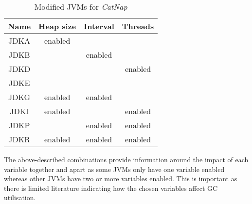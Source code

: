 \begin{table}
    \centering
    \begin{tabular}{|c|c|c|c|}
    \hline
      \textbf{ Name}  & \textbf{Heap size} & \textbf{Interval} & \textbf{Threads}  \\
          \hline

        JDKA & enabled & &\\
            \hline

        JDKB & & enabled & \\
            \hline

        JDKD & & & enabled \\
            \hline

        JDKE  & & & \\
            \hline

        JDKG & enabled & enabled & \\
            \hline

        JDKI & enabled & & enabled \\
            \hline

        JDKP & & enabled & enabled \\
            \hline

        JDKR & enabled & enabled & enabled \\
            \hline

    \end{tabular}
    \caption{Modified JVMs for \emph{CatNap}}
    \label{tab:catnap--label}
\end{table}
The above-described combinations provide information around the impact
of each variable together and apart as some JVMs only have one variable enabled whereas other JVMs have two or more variables enabled. This is important as there is
limited literature indicating how the chosen variables affect GC
utilisation.
